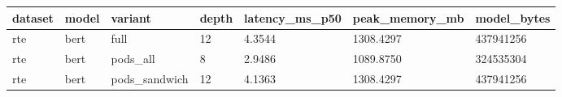 \begin{tabular}{lllllll}
\hline
dataset & model & variant & depth & latency\_ms\_p50 & peak\_memory\_mb & model\_bytes \\
\hline
rte & bert & full & 12 & 4.3544 & 1308.4297 & 437941256 \\
rte & bert & pods\_all & 8 & 2.9486 & 1089.8750 & 324535304 \\
rte & bert & pods\_sandwich & 12 & 4.1363 & 1308.4297 & 437941256 \\
\hline
\end{tabular}

